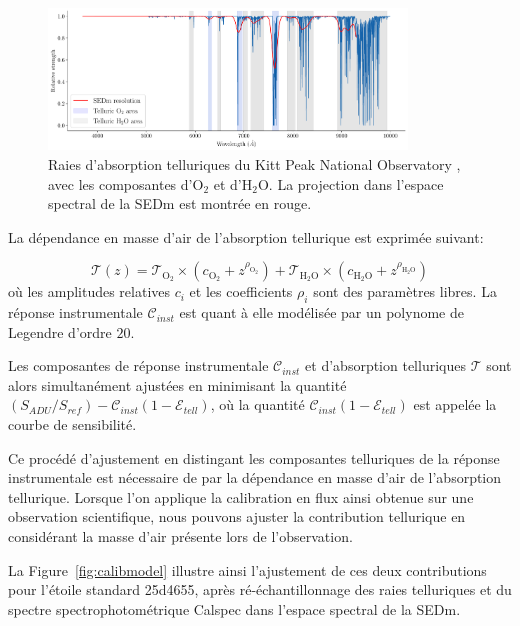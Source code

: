 \documentclass[../main/main.tex]{subfiles}
\begin{document}
\begin{figure}[ht]
  \centering
  \includegraphics[width=0.85\textwidth]{../figures/06_irf/telluricspec.pdf}
  \caption[Raies d'absorption telluriques]{Raies d'absorption
    telluriques du Kitt Peak National Observatory \citep{Hinkle2003}, avec les composantes d'$\text{O}_{2}$ et
    d'$\text{H}_{2}\text{O}$. La projection dans l'espace spectral de la
  SEDm est montrée en rouge.}
  \label{fig:telluriclines}
\end{figure}

La dépendance en masse d'air de l'absorption tellurique est exprimée suivant:

\begin{equation*}
  \label{eq:telluricpysedm2}
  \mathcal{T}(z) =
  \mathcal{T}_{\text{O}_{2}}\times(c_{\text{O}_{2}}+z^{\rho_{\text{O}_{2}}})
  + \mathcal{T}_{\text{H}_{2}\text{O}}\times(c_{\text{H}_{2}\text{O}}+z^{\rho_{\text{H}_{2}\text{O}}})
\end{equation*}
où les amplitudes relatives $c_{i}$ et les coefficients
$\rho_{i}$ sont des paramètres libres. La réponse instrumentale
$\mathcal{C}_{inst}$ est quant à elle modélisée par un polynome de Legendre
d'ordre $20$.


Les composantes de réponse instrumentale $\mathcal{C}_{inst}$ et
d'absorption telluriques $\mathcal{T}$ sont alors simultanément
ajustées en minimisant la quantité ~$(S_{ADU}/S_{ref}) - \mathcal{C}_{inst}(1-
\mathcal{E}_{tell})$, où la quantité $\mathcal{C}_{inst}(1-
\mathcal{E}_{tell})$ est appelée la courbe de
sensibilité.

Ce procédé d'ajustement en distingant les composantes telluriques de la
réponse instrumentale est nécessaire de par la dépendance en masse
d'air de l'absorption tellurique. Lorsque l'on applique la
calibration en flux ainsi obtenue sur une observation scientifique, nous
pouvons ajuster la contribution tellurique en considérant la masse d'air
présente lors de l'observation.

La Figure~\ref{fig:calibmodel} illustre ainsi l'ajustement de ces deux
contributions pour l'étoile standard 25d4655, après ré-échantillonnage
des raies telluriques et du spectre spectrophotométrique Calspec dans
l'espace spectral de la SEDm.
\end{document}
